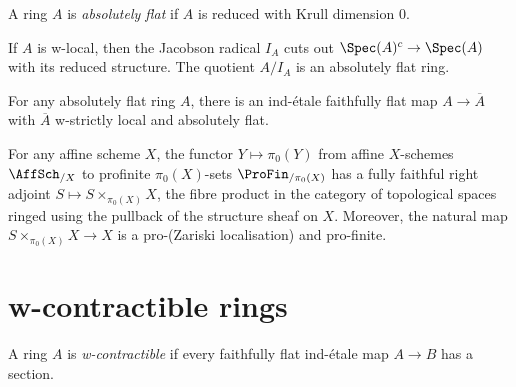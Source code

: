 \begin{definition}
    A ring \(A\) is \emph{absolutely flat} if \(A\) is reduced with Krull dimension \(0\).
    \label{def:absolute-flat-ring}
\end{definition}

\begin{lemma}
    \label{lem:w-local-quotient-Jacobson-absolute-flat}

    If \(A\) is w-local, then the Jacobson radical \(I_A\) cuts out \(\Spec(A)^c \to \Spec(A)\) with its reduced structure. The quotient \(A/I_A\) is an absolutely flat ring.
\end{lemma}

\begin{lemma}
    \label{lem:absolute-flat-exists-ind-etale-w-strictly-local}

    For any absolutely flat ring $A$, there is an ind-étale faithfully flat map $A \to \overline{A}$ with $\overline{A}$ w-strictly local and absolutely flat. %
\end{lemma}

\begin{definition}%
    \label{lem:decouple-topology-from-algebra}

    For any affine scheme $X$, the functor $Y \mapsto \pi_0(Y)$ from affine $X$-schemes \(\AffSch_{/X}\) to profinite $\pi_0(X)$-sets \(\ProFin_{/\pi_0(X)}\) has a fully faithful right adjoint $S \mapsto S \times_{\pi_0(X)} X$, the fibre product in the category of topological spaces ringed using the pullback of the structure sheaf on $X$. Moreover, the natural map $S \times_{\pi_0(X)} X \to X$ is a pro-(Zariski localisation) and pro-finite.
\end{definition}

\section{w-contractible rings}

\begin{definition}
A ring \(A\) is \emph{w-contractible} if every faithfully flat ind-\'etale map \(A \to B\) has a section.
    \label{def:w-contractible-ring}
\end{definition}

